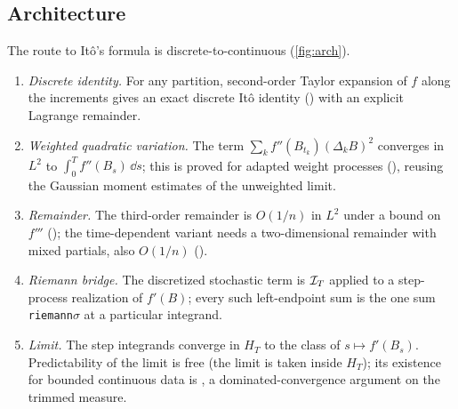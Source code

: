 \documentclass[11pt]{article}
\newcommand{\HT}{H_T}
\begin{document}
\subsection{Architecture}
The route to It\^o's formula is discrete-to-continuous (\cref{fig:arch}).
\begin{enumerate}
\item \emph{Discrete identity.} For any partition, second-order Taylor expansion of $f$ along the
  increments gives an exact discrete It\^o identity () with an explicit Lagrange
  remainder.
\item \emph{Weighted quadratic variation.} The term $\sum_kf''(B_{t_k})(\Delta_kB)^2$ converges in $L^2$
  to $\int_0^Tf''(B_s)\,\dd s$; this is proved for adapted weight processes
  (), reusing the Gaussian moment estimates of the unweighted limit.
\item \emph{Remainder.} The third-order remainder is $O(1/n)$ in $L^2$ under a bound on $f'''$
  (); the time-dependent variant needs a two-dimensional remainder with mixed
  partials, also $O(1/n)$ ().
\item \emph{Riemann bridge.} The discretized stochastic term is $\mathcal{I}_T$ applied to a step-process
  realization of $f'(B)$; every such left-endpoint sum is the one sum \texttt{riemann}$\sigma$ at a particular integrand.
\item \emph{Limit.} The step integrands converge in $\HT$ to the class of $s\mapsto f'(B_s)$. Predictability
  of the limit is free (the limit is taken inside $\HT$); its existence for bounded continuous data is
  , a dominated-convergence argument on the trimmed measure.
\end{enumerate}
\end{document}
